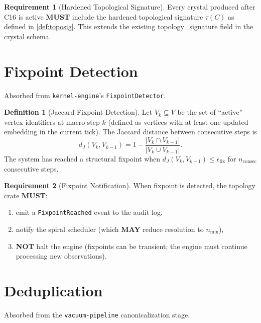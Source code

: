 \documentclass[11pt,a4paper,twoside]{article}
\theoremstyle{definition}
\newtheorem{definition}{Definition}[section]
\newtheorem{requirement}{Requirement}[section]
\theoremstyle{plain}
\theoremstyle{remark}
\begin{document}
\begin{requirement}[Hardened Topological Signature]\label{req:hardenedtopo}
Every crystal produced after C16 is active \textbf{MUST} include the
hardened topological signature $\tau(C)$ as defined in
\cref{def:toposig}. This extends the existing topology\_signature field
in the crystal schema.
\end{requirement}


\section{Fixpoint Detection}\label{sec:topo:fixpoint}

Absorbed from \texttt{kernel-engine}'s \texttt{FixpointDetector}.

\begin{definition}[Jaccard Fixpoint Detection]\label{def:jaccardfix}
Let $V_k \subseteq V$ be the set of ``active'' vertex identifiers at
macro-step $k$ (defined as vertices with at least one updated embedding
in the current tick). The Jaccard distance between consecutive steps is
\[
  d_J(V_k, V_{k-1}) = 1 - \frac{|V_k \cap V_{k-1}|}{|V_k \cup V_{k-1}|}.
\]
The system has reached a structural fixpoint when
$d_J(V_k, V_{k-1}) \le \epsilon_{\mathrm{fix}}$ for
$n_{\mathrm{consec}}$ consecutive steps.
\end{definition}

\begin{requirement}[Fixpoint Notification]\label{req:fixnotify}
When fixpoint is detected, the topology crate \textbf{MUST}:
\begin{enumerate}[nosep,label=(\alph*)]
  \item emit a \texttt{FixpointReached} event to the audit log,
  \item notify the spiral scheduler (which \textbf{MAY} reduce
        resolution to $n_{\min}$),
  \item \textbf{NOT} halt the engine (fixpoints can be transient; the
        engine must continue processing new observations).
\end{enumerate}
\end{requirement}


\section{Deduplication}\label{sec:topo:dedup}

Absorbed from the \texttt{vacuum-pipeline} canonicalization stage.
\end{document}
